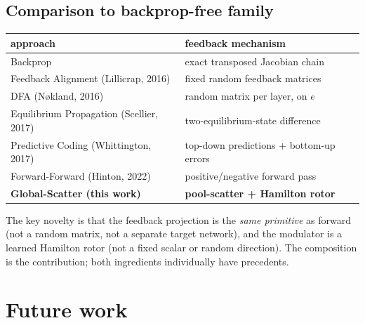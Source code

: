 \documentclass[10pt,a4paper]{article}
\begin{document}
\subsection{Comparison to backprop-free family}

\begin{center}
\begin{tabular}{ll}
\toprule
approach & feedback mechanism \\
\midrule
Backprop                            & exact transposed Jacobian chain \\
Feedback Alignment (Lillicrap, 2016) & fixed random feedback matrices \\
DFA (N{\o}kland, 2016)              & random matrix per layer, on $e$ \\
Equilibrium Propagation (Scellier, 2017) & two-equilibrium-state difference \\
Predictive Coding (Whittington, 2017) & top-down predictions + bottom-up errors \\
Forward-Forward (Hinton, 2022)       & positive/negative forward pass \\
\textbf{Global-Scatter (this work)}  & \textbf{pool-scatter + Hamilton rotor} \\
\bottomrule
\end{tabular}
\end{center}

The key novelty is that the feedback projection is the \emph{same
primitive} as forward (not a random matrix, not a separate target
network), and the modulator is a learned Hamilton rotor (not a fixed
scalar or random direction). The composition is the contribution; both
ingredients individually have precedents.

\section{Future work}
\end{document}
